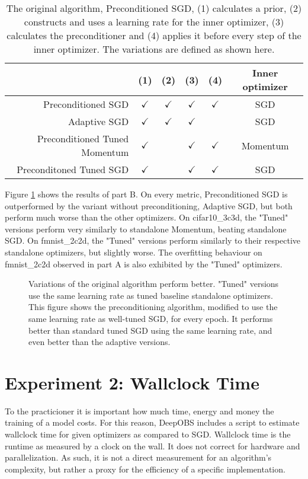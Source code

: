 \documentclass[twoside,12pt,a4paper]{report}
\begin{document}
\begin{table}[h]
	\centering
	\begin{tabular}{|r||c|c|c|c|c|}
		\hline 
		& (1) & (2) & (3) & (4) & Inner optimizer\\ 
		\hline 
		Preconditioned SGD & $\checkmark$ & $\checkmark$& $\checkmark$ & $\checkmark$ & SGD \\ 
		\hline 
		Adaptive SGD & $\checkmark$ & $\checkmark$ & $\checkmark$ & & SGD \\ 
		\hline 
		Preconditioned Tuned Momentum & $\checkmark$ & & $\checkmark$ & $\checkmark$ & Momentum \\ 
		\hline 
		Preconditoned Tuned SGD & $\checkmark$ &  & $\checkmark$ & $\checkmark$ & SGD \\ 
		\hline 
	\end{tabular}
	\caption{The original algorithm, Preconditioned SGD, (1) calculates a prior, (2) constructs and uses a learning rate for the inner optimizer, (3) calculates the preconditioner and (4) applies it before every step of the inner optimizer. The variations are defined as shown here.}
	\label{tab:exp_tunedalpha}
\end{table}

Figure \ref{fig:exp_tunedalpha} shows the results of part B. 
On every metric, Preconditioned SGD is outperformed by the variant without preconditioning, Adaptive SGD, but both perform much worse than the other optimizers.
On cifar10\_3c3d, the "Tuned" versions perform very similarly to standalone Momentum, beating standalone SGD. On fmnist\_2c2d, the "Tuned" versions perform similarly to their respective standalone optimizers, but slightly worse.
The overfitting behaviour on fmnist\_2c2d observed in part A is also exhibited by the "Tuned" optimizers.
\begin{figure}
		
		\caption{Variations of the original algorithm perform better. "Tuned" versions use the same learning rate as tuned baseline standalone optimizers.
			This figure shows the preconditioning algorithm, modified to use the same learning rate as well-tuned SGD, for every epoch. It performs better than standard tuned SGD using the same learning rate, and even better than the adaptive versions.}
		\label{fig:exp_tunedalpha}
\end{figure}

\section{Experiment 2: Wallclock Time}
To the practicioner it is important how much time, energy and money the training of a model costs. For this reason, DeepOBS includes a script to estimate wallclock time for given optimizers as compared to SGD. Wallclock time is the runtime as measured by a clock on the wall. It does not correct for hardware and parallelization. As such, it is not a direct measurement for an algorithm's complexity, but rather a proxy for the efficiency of a specific implementation.
\end{document}
